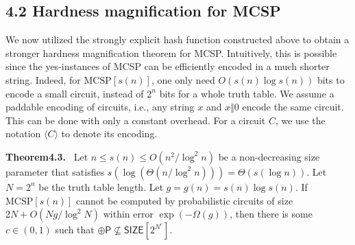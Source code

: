 \documentclass[10pt,a4paper]{article}
\newenvironment{authorclaim}[1]{\par\medskip\noindent\textbf{#1.}\ }{\par\medskip}
\begin{document}
\subsection*{4.2 Hardness magnification for MCSP}
We now utilized the strongly explicit hash function constructed above to obtain a stronger hardness magnification theorem for MCSP. Intuitively, this is possible since the yes-instances of MCSP can be efficiently encoded in a much shorter string. Indeed, for $\mathrm{MCSP}[s(n)]$, one only need $O(s(n)\log s(n))$ bits to encode a small circuit, instead of $2^n$ bits for a whole truth table.
We assume a paddable encoding of circuits, i.e., any string $x$ and $x\Vert0$ encode the same circuit. This can be done with only a constant overhead. For a circuit $C$, we use the notation $\langle C\rangle$ to denote its encoding.

\begin{authorclaim}{Theorem4.3}
Let $n\le s(n)\le O(n^2/\log^2n)$ be a non-decreasing size parameter that satisfies $s(\log(\Theta(n/\log^2n)))=\Theta(s(\log n))$. Let $N=2^n$ be the truth table length. Let $g=g(n)=s(n)\log s(n)$. If $\mathrm{MCSP}[s(n)]$ cannot be computed by probabilistic circuits of size $2N+O(Ng/\log^2N)$ within error $\exp(-\Omega(g))$, then there is some $c\in(0,1)$ such that $\oplus\mathsf P\not\subseteq\mathsf{SIZE}[2^{N^c}]$.
\end{authorclaim}
\end{document}
